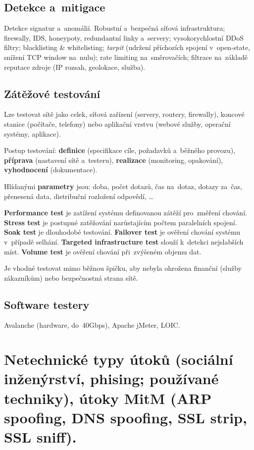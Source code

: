 \clearpage

\subsection{Detekce a~mitigace}

Detekce signatur a~anomálií. Robustní a~bezpečná síťová infrastruktura; firewally, IDS, honeypoty, redundantní linky a~servery; vysokorychlostní DDoS filtry; blacklisting \& whitelisting; \emph{tarpit} (udržení příchozích spojení v~open-state, snížení TCP window na~nulu); rate limiting na~směrovačích; filtrace na~základě reputace zdroje (IP rozsah, geolokace, služba).

\subsection{Zátěžové testování}

Lze testovat sítě jako celek, síťová zařízení (servery, routery, firewally), koncové stanice (počítače, telefony) nebo aplikační vrstvu (webové služby, operační systémy, aplikace).

Postup testování: \textbf{definice} (specifikace cíle, požadavků a~běžného provozu), \textbf{příprava} (nastavení sítě a~testeru), \textbf{realizace} (monitoring, opakování), \textbf{vyhodnocení} (dokumentace).

Hlídanými \textbf{parametry} jsou: doba, počet dotazů, čas na~dotaz, dotazy za~čas, přenesená data, distribuční rozložení odpovědí, \dots

\textbf{Performance test} je zatížení systému definovanou zátěží pro~změření chování. \textbf{Stress test} je postupné zatěžování narůstajícím počtem paralelních spojení. \textbf{Soak test} je dlouhodobé testování. \textbf{Failover test} je ověření chování systému v~případě selhání. \textbf{Targeted infrastructure test} slouží k~detekci nejslabších míst. \textbf{Volume test} je ověření chování při~zvýšeném objemu dat.

Je vhodné testovat mimo běžnou špičku, aby nebyla ohrožena finanční (služby zákazníkům) nebo bezpečnostná strana sítě.

\subsection{Software testery}

Avalanche (hardware, do~40Gbps), Apache jMeter, LOIC.

\clearpage
\section{Netechnické typy útoků (sociální inženýrství, phising; používané techniky), útoky MitM (ARP spoofing, DNS spoofing, SSL strip, SSL sniff).}

